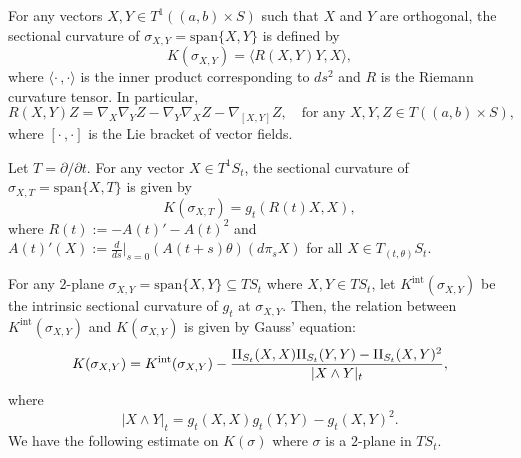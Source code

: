 \documentclass[JEP,XML,SOM,Unicode,NoFloatCountersInSection]{cedram}
\newcommand{\Int}{\mathrm{int}}
\theoremstyle{definition}
\newcommand{\RomanNumeralCaps}[1]
{\MakeUppercase{\romannumeral #1}}
\newcommand{\II}{\textup{\RomanNumeralCaps{2}}}
\renewcommand{\>}{{\rangle}}
\newcommand{\<}{{\langle}}
\begin{document}
For any vectors $X,Y\in T^1\left((a,b)\times S\right)$ such that $X$ and $Y$ are orthogonal, the sectional curvature of $\sigma_{X,Y}=\text{span}\{X, Y\}$ is defined by
\begin{equation}\label{sectional curvature}
K(\sigma_{X,Y})=\langle R(X,Y)Y,X\rangle,
\end{equation}
where $\langle\cdot\,,\cdot\rangle$ is the inner product corresponding to $ds^2$ and $R$ is the Riemann curvature tensor. In particular,
\begin{equation*}
R(X,Y)Z = \nabla_X\nabla_Y Z-\nabla_Y\nabla_X Z-\nabla_{[X,Y]}Z, \quad \text{for any } X,Y, Z\in T((a,b)\times S),
\end{equation*}
where $[\cdot\,,\cdot]$ is the Lie bracket of vector fields.

Let $T=\partial/\partial t$. For any vector $X\in T^1S_t$, the sectional curvature of $\sigma_{X,T}=\text{span}\{X, T\}$ is given by
\begin{equation}\label{def: normal sectional}
K(\sigma_{X,T})=g_t(R(t)X, X),
\end{equation}
where $R(t):=-A(t)'-A(t)^2$ and $A(t)'(X):=\frac{d}{ds}\big|_{s=0}\left(A(t+s)\theta\right)(d\pi_s X)$ for all $X\in T_{(t,\theta)}S_t$.

For any $2$-plane $\sigma_{X,Y}=\text{span}\{X, Y\}\subseteq TS_t$ where $X, Y\in TS_t$, let $K^{\Int}(\sigma_{X,Y})$ be the intrinsic sectional curvature of $g_t$ at $\sigma_{X,Y}$. Then, the relation between $K^{\Int}(\sigma_{X, Y})$ and $K(\sigma_{X, Y})$ is given by Gauss' equation:
\begin{equation}\label{Gauss equation}
K(\sigma_{X, Y})=K^{\Int}(\sigma_{X, Y})-\frac{\II_{S_t}(X, X)\II_{S_t}(Y, Y)-\II_{S_t}(X, Y)^2}{|X\wedge Y|_t},
\end{equation}
where
\begin{equation}\label{XwedgeY}
|X\wedge Y|_t=g_t(X, X)g_t(Y, Y)-g_t(X, Y)^2.
\end{equation}
We have the following estimate on $K(\sigma)$ where
$\sigma$ is a $2$-plane in $TS_t$.
\end{document}
